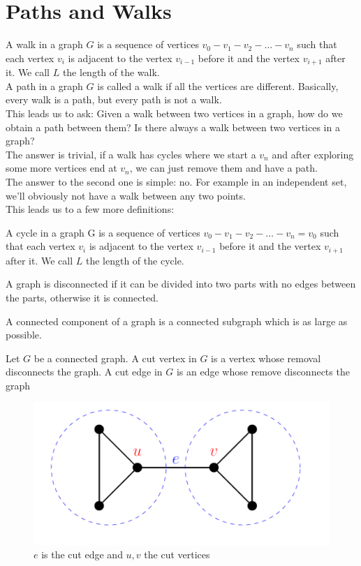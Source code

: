 \section{Paths and Walks}
A walk in a graph $G$ is a sequence of vertices $v_0 - v_1 - v_2 - \dots - v_n$ such that each vertex $v_i$ is adjacent to the vertex $v_{i-1}$ before it and the vertex $v_{i+1}$ after it. We call $L$ the length of the walk.\\
A path in a graph $G$ is called a walk if all the vertices are different. Basically, every walk is a path, but every path is not a walk.\\
This leads us to ask: Given a walk between two vertices in a graph, how do we obtain a path between them? Is there always a walk between two vertices in a graph?\\
The answer is trivial, if a walk has cycles where we start a $v_n$ and after exploring some more vertices end at $v_n$, we can just remove them and have a path.\\
The answer to the second one is simple: no. For example in an independent set, we'll obviously not have a walk between any two points. \\
This leads us to a few more definitions:\\
\begin{definition}
    A cycle in a graph G is a sequence of vertices $v_0 - v_1 - v_2 - \dots  - v_n = v_0$ such that each vertex $v_i$ is adjacent to the vertex $v_{i-1}$ before it and the vertex $v_{i+1}$ after it. We call $L$ the length of the cycle.
\end{definition}
\begin{definition}
    A graph is disconnected if it can be divided into two parts with no edges between the parts, otherwise it is connected.
\end{definition}
\begin{definition}
    A connected component of a graph is a connected subgraph which is as large as possible.
\end{definition}
\begin{definition}
    Let $G$ be a connected graph. A cut vertex in $G$ is a vertex whose removal disconnects the graph. A cut edge in $G$ is an edge whose remove disconnects the graph
    \begin{figure}[h]
        \centering
        \includegraphics[width=0.5\linewidth]{Photos/Cut vertex.png}
        \caption{$e$ is the cut edge and $u,v$ the cut vertices}
        
    \end{figure}
\end{definition}
